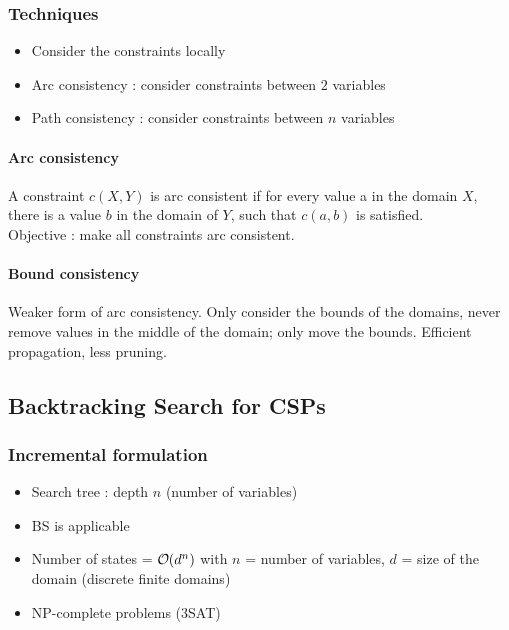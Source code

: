 \subsubsection{Techniques}

\begin{itemize}
\item Consider the constraints locally
\item Arc consistency : consider constraints between $2$ variables
\item Path consistency : consider constraints between $n$ variables
\end{itemize}

\paragraph{Arc consistency}

A constraint $c(X, Y)$ is arc consistent if for every value a in the domain $X$, there is a value $b$ in the domain of $Y$, such that $c(a,b)$ is satisfied.\\
Objective : make all constraints arc consistent.

\paragraph{Bound consistency}

Weaker form of arc consistency. Only consider the bounds of the domains, never remove values in the middle of the domain; only move the bounds. Efficient propagation, less pruning.

\subsection{Backtracking Search for CSPs}

\subsubsection{Incremental formulation}

\begin{itemize}
\item Search tree : depth $n$ (number of variables)
\item BS is applicable
\item Number of states = $\bigO (d^n)$ with $n$ = number of variables, $d$ = size of the domain (discrete finite domains)
\item NP-complete problems (3SAT) 
\end{itemize}

